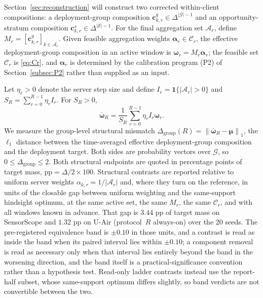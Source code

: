 \documentclass[letterpaper,journal]{IEEEtran}
\begin{document}
Section~\ref{sec:reconstruction} will construct two corrected within-client
compositions: a deployment-group composition
$\mathbf{c}^{g}_{k,r}\in\Delta^{|\mathcal{G}|-1}$ and an opportunity-stratum
composition $\mathbf{c}^{s}_{k,r}\in\Delta^{|\mathcal{S}|-1}$.  For the final
aggregation set $\mathcal{A}_r$, define
$M_r=[\mathbf{c}^{g}_{k,r}]_{k\in\mathcal{A}_r}$.  Given feasible aggregation
weights $\boldsymbol\alpha_r\in\mathcal{C}_r$, the effective deployment-group
composition in an active window is $\boldsymbol\omega_r=M_r\boldsymbol\alpha_r$;
the feasible set $\mathcal{C}_r$ is \eqref{eq:Cr}, and $\boldsymbol\alpha_r$ is
determined by the calibration program (P2) of Section~\ref{subsec:P2} rather than
supplied as an input.

Let $\eta_r>0$ denote the server step size and define
$I_r=\mathbf{1}\{|\mathcal{A}_r|>0\}$ and
$S_R=\sum_{r=0}^{R-1}\eta_r I_r$.
For $S_R>0$,
\begin{equation}
    \overline{\boldsymbol\omega}_R
    =
    \frac{1}{S_R}
    \sum_{r=0}^{R-1}
    \eta_r I_r\boldsymbol\omega_r.
    \label{eq:omega_bar}
\end{equation}
We measure the group-level structural mismatch
$\Delta_{\mathrm{group}}(R)=\left\|
\overline{\boldsymbol\omega}_R-\boldsymbol\mu
\right\|_1$,
the $\ell_1$ distance between the time-averaged effective deployment-group
composition and the deployment target.  Both sides are probability vectors
over $\mathcal{G}$, so $0\le\Delta_{\mathrm{group}}\le2$.  Both structural
endpoints are quoted in percentage points of target mass,
$\mathrm{pp}=\Delta/2\times100$.  Structural contrasts are reported relative to
uniform server weights $\alpha_{k,r}=1/|\mathcal{A}_r|$ and, where they turn on
the reference, in units of the closable gap between uniform weighting and the
same-support hindsight optimum, at the same active set, the same $M_r$, the same
$\mathcal{C}_r$, and with all windows known in advance.  That gap is $3.44$ pp of
target mass on SensorScope and $1.32$ pp on U-Air (protocol~$R$ always-on) over
the $20$ seeds.  The pre-registered equivalence band is $\pm0.10$ in those
units, and a contrast is read as inside the band when its paired interval lies
within $\pm0.10$; a component removal is read as necessary only when that
interval lies entirely beyond the band in the worsening direction, and the band
itself is a practical-significance convention rather than a hypothesis test.
Read-only ladder contrasts instead use the report-half subset, whose
same-support optimum differs slightly, so band verdicts are not convertible
between the two.
\end{document}
